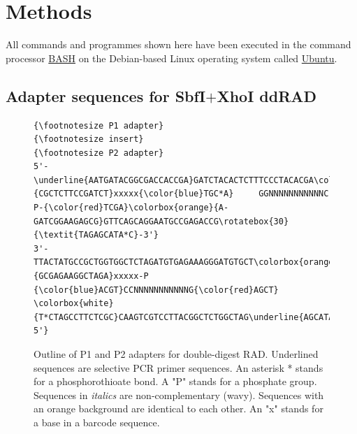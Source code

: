 \documentclass[a4paper,12pt,times,print,index,custombib,custommargin]{PhDThesisPSnPDF}\usepackage[]{graphicx}\usepackage[]{color}
\begin{document}

\section{Methods}

All commands and programmes shown here have been executed in the command processor \href{http://en.wikipedia.org/wiki/Bash_%28Unix_shell%29}{BASH} on the  Debian-based Linux operating system called \href{http://en.wikipedia.org/wiki/Ubuntu_%28operating_system%29}{Ubuntu}.

\subsection{Adapter sequences for SbfI$+$XhoI ddRAD}\label{ch:adapter_sequences}

\begin{figure}[H]
\begin{Verbatim}[fontfamily=courier, fontsize=\relsize{-7}, commandchars=\\\{\}] 
          {\footnotesize P1 adapter}                                        {\footnotesize insert}                                   {\footnotesize P2 adapter}
5'-\underline{AATGATACGGCGACCACCGA}GATCTACACTCTTTCCCTACACGA\colorbox{white}{CGCTCTTCCGATCT}xxxxx{\color{blue}TGC*A}     GGNNNNNNNNNNNC     P-{\color{red}TCGA}\colorbox{orange}{A-GATCGGAAGAGCG}GTTCAGCAGGAATGCCGAGACCG\rotatebox{30}{\textit{TAGAGCATA*C}-3'}
3'-TTACTATGCCGCTGGTGGCTCTAGATGTGAGAAAGGGATGTGCT\colorbox{orange}{GCGAGAAGGCTAGA}xxxxx-P    {\color{blue}ACGT}CCNNNNNNNNNNNG{\color{red}AGCT}       \colorbox{white}{T*CTAGCCTTCTCGC}CAAGTCGTCCTTACGGCTCTGGCTAG\underline{AGCATACGGCAGAAGACGAAC-5'}
\end{Verbatim}
\caption{Outline of P1 and P2 adapters for double-digest RAD. Underlined sequences are selective PCR primer sequences. An asterisk * stands for a phosphorothioate bond. A "P" stands for a phosphate group. Sequences in \textit{italics} are non-complementary (wavy). Sequences with an orange background are identical to each other. An "x" stands for a base in a barcode sequence.}
\label{adapter_outline} %
\end{figure}
\end{document}
